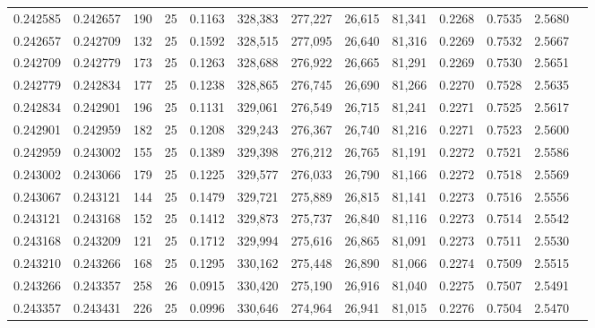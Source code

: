 \begin{tabular}{rrrrrrrrrrrrr}
0.242585 & 0.242657 &   190 &  25 &                                     0.1163 & 328,383 & 277,227 &  26,615 &  81,341 & 0.2268 & 0.7535 & 2.5680 \\
0.242657 & 0.242709 &   132 &  25 &                                     0.1592 & 328,515 & 277,095 &  26,640 &  81,316 & 0.2269 & 0.7532 & 2.5667 \\
0.242709 & 0.242779 &   173 &  25 &                                     0.1263 & 328,688 & 276,922 &  26,665 &  81,291 & 0.2269 & 0.7530 & 2.5651 \\
0.242779 & 0.242834 &   177 &  25 &                                     0.1238 & 328,865 & 276,745 &  26,690 &  81,266 & 0.2270 & 0.7528 & 2.5635 \\
0.242834 & 0.242901 &   196 &  25 &                                     0.1131 & 329,061 & 276,549 &  26,715 &  81,241 & 0.2271 & 0.7525 & 2.5617 \\
0.242901 & 0.242959 &   182 &  25 &                                     0.1208 & 329,243 & 276,367 &  26,740 &  81,216 & 0.2271 & 0.7523 & 2.5600 \\
0.242959 & 0.243002 &   155 &  25 &                                     0.1389 & 329,398 & 276,212 &  26,765 &  81,191 & 0.2272 & 0.7521 & 2.5586 \\
0.243002 & 0.243066 &   179 &  25 &                                     0.1225 & 329,577 & 276,033 &  26,790 &  81,166 & 0.2272 & 0.7518 & 2.5569 \\
0.243067 & 0.243121 &   144 &  25 &                                     0.1479 & 329,721 & 275,889 &  26,815 &  81,141 & 0.2273 & 0.7516 & 2.5556 \\
0.243121 & 0.243168 &   152 &  25 &                                     0.1412 & 329,873 & 275,737 &  26,840 &  81,116 & 0.2273 & 0.7514 & 2.5542 \\
0.243168 & 0.243209 &   121 &  25 &                                     0.1712 & 329,994 & 275,616 &  26,865 &  81,091 & 0.2273 & 0.7511 & 2.5530 \\
0.243210 & 0.243266 &   168 &  25 &                                     0.1295 & 330,162 & 275,448 &  26,890 &  81,066 & 0.2274 & 0.7509 & 2.5515 \\
0.243266 & 0.243357 &   258 &  26 &                                     0.0915 & 330,420 & 275,190 &  26,916 &  81,040 & 0.2275 & 0.7507 & 2.5491 \\
0.243357 & 0.243431 &   226 &  25 &                                     0.0996 & 330,646 & 274,964 &  26,941 &  81,015 & 0.2276 & 0.7504 & 2.5470 \\

\end{tabular}
